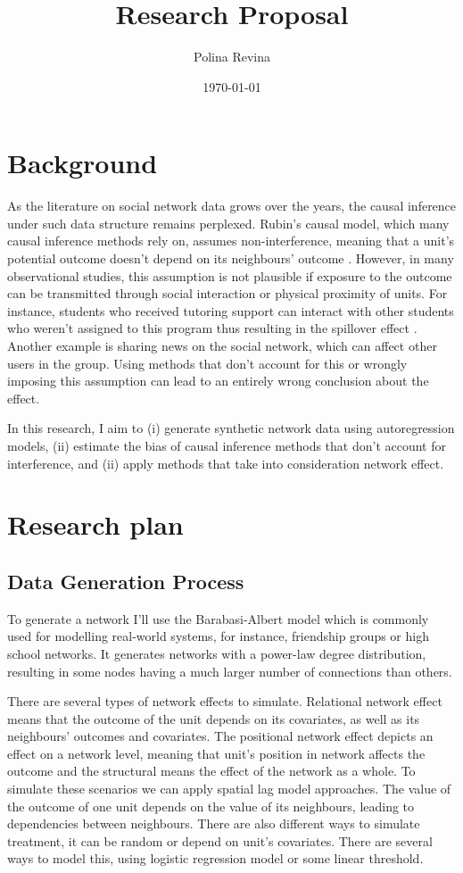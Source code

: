 \documentclass{article}
\title{Research Proposal}
\author{Polina Revina}
\date{\today}
\begin{document}
\maketitle

\section{Background}

As the literature on social network data grows over the years, the causal inference under such data structure remains perplexed. Rubin's causal model, which many causal inference methods rely on, assumes non-interference, meaning that a unit’s potential outcome doesn’t depend on its neighbours' outcome \cite{cox1958planning}. However, in many observational studies, this assumption is not plausible if exposure to the outcome can be transmitted through social interaction or physical proximity of units. For instance, students who received tutoring support can interact with other students who weren’t assigned to this program thus resulting in the spillover effect \cite{forastiere2021identification}. Another example is sharing news on the social network, which can affect other users in the group. Using methods that don’t account for this or wrongly imposing this assumption can lead to an entirely wrong conclusion about the effect.

In this research, I aim to (i) generate synthetic network data using autoregression models, (ii) estimate the bias of causal inference methods that don’t account for interference, and (ii) apply methods that take into consideration network effect. 

\section{Research plan}
\subsection*{Data Generation Process}

To generate a network I’ll use the Barabasi-Albert model which is commonly used for modelling real-world systems, for instance, friendship groups or high school networks. It generates networks with a power-law degree distribution, resulting in some nodes having a much larger number of connections than others. 

There are several types of network effects to simulate. Relational network effect means that the outcome of the unit depends on its covariates, as well as its neighbours' outcomes and covariates. The positional network effect depicts an effect on a network level, meaning that unit's position in network affects the outcome and the structural means the effect of the network as a whole. To simulate these scenarios we can apply spatial lag model approaches. The value of the outcome of one unit depends on the value of its neighbours, leading to dependencies between neighbours. There are also different ways to simulate treatment, it can be random or depend on unit’s covariates. There are several ways to model this, using logistic regression model or some linear threshold. \\ 

\printbibliography
\end{document}

